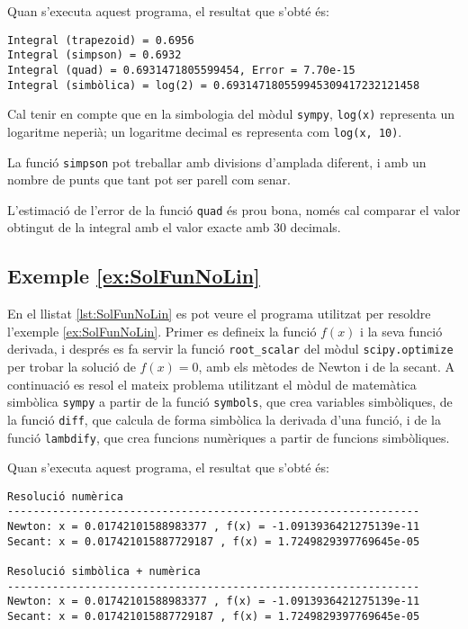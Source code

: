 Quan s'executa aquest programa, el resultat que s'obté és:
\lstset{
	language=,
	numbers=none,
	frame=none
}
\begin{lstlisting}
Integral (trapezoid) = 0.6956
Integral (simpson) = 0.6932
Integral (quad) = 0.6931471805599454, Error = 7.70e-15
Integral (simbòlica) = log(2) = 0.693147180559945309417232121458
\end{lstlisting} 

Cal tenir en compte que en la simbologia del mòdul \texttt{sympy}, \texttt{log(x)} representa un logaritme neperià; un logaritme decimal es representa com \texttt{log(x, 10)}.

La funció \texttt{simpson}  pot treballar amb divisions d'amplada diferent, i amb un nombre de punts que tant pot ser parell com senar.

L'estimació de l'error de la funció \texttt{quad} és prou bona, només cal comparar el valor obtingut de la integral  amb el valor exacte amb 30 decimals.


\hypertarget{exemple:SolFunNoLin}{\subsection{Exemple \ref*{ex:SolFunNoLin} \SolFunNoLin}}
En el llistat \vref{lst:SolFunNoLin} es pot veure el programa utilitzat per resoldre l'exemple \vref{ex:SolFunNoLin}. Primer es defineix la funció $f(x)$ i la seva funció derivada, i després es fa servir la funció \texttt{root\_scalar}  del mòdul \texttt{scipy.optimize} per trobar la solució de $f(x)=0$, amb els mètodes de Newton i de la secant. A continuació es resol el mateix problema utilitzant el mòdul  de matemàtica simbòlica \texttt{sympy} a partir de la funció \texttt{symbols}, que crea variables simbòliques, de la funció \texttt{diff}, que calcula de forma simbòlica la derivada d'una funció, i de la funció  \texttt{lambdify}, que crea funcions numèriques a partir de funcions simbòliques.




Quan s'executa aquest programa, el resultat que s'obté és:
\lstset{
	language=,
	numbers=none,
	frame=none
}
\begin{lstlisting}
Resolució numèrica
----------------------------------------------------------------
Newton: x = 0.01742101588983377 , f(x) = -1.0913936421275139e-11
Secant: x = 0.017421015887729187 , f(x) = 1.7249829397769645e-05

Resolució simbòlica + numèrica
----------------------------------------------------------------
Newton: x = 0.01742101588983377 , f(x) = -1.0913936421275139e-11
Secant: x = 0.017421015887729187 , f(x) = 1.7249829397769645e-05
\end{lstlisting} 
